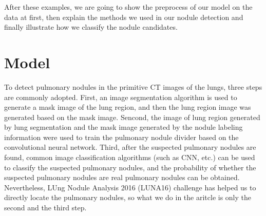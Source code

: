 \documentclass[conference]{IEEEtran}
\begin{document}
After these examples, we are going to show the preprocess of our model on the data at first, then explain the methods we used in our nodule detection and finally illustrate how we classify the nodule candidates.
\section{Model}
To detect pulmonary nodules in the primitive CT images of the lungs, three steps are commonly adopted. First, an image segmentation algorithm is used to generate a mask image of the lung region, and then the lung region image was generated based on the mask image.
Sencond, the image of lung region generated by lung segmentation and the mask image generated by the nodule labeling information were used to train the pulmonary nodule divider based on the convolutional neural network. Third,
after the suspected pulmonary nodules are found, common image classification algorithms (such as CNN, etc.) can be used to classify the suspected pulmonary nodules, and the probability of whether the suspected pulmonary nodules are real pulmonary nodules can be obtained.
Nevertheless, LUng
Nodule Analysis 2016 (LUNA16) challenge\cite{1612.08012} has helped us to directly locate the pulmonary nodules, so what we do in the aritcle is only the second and the third step.
\end{document}

